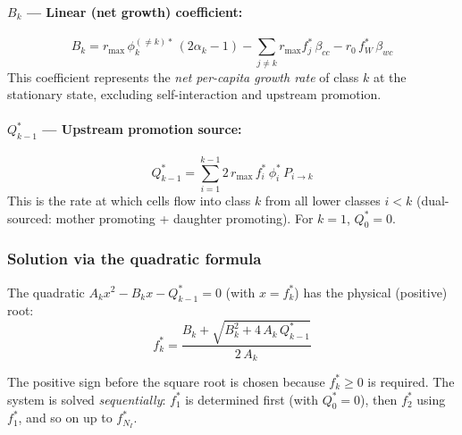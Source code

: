 \documentclass[11pt,a4paper]{article}
\begin{document}
\paragraph{$B_k$ --- Linear (net growth) coefficient:}
\begin{equation}
    B_k = r_{\text{max}}\,\phi_k^{(\neq k)*}\,(2\alpha_k - 1) - \sum_{j \neq k} r_{\text{max}} f_j^*\,\beta_{cc} - r_0\,f_W^*\,\beta_{wc}
\end{equation}
This coefficient represents the \emph{net per-capita growth rate} of class $k$ at the stationary state, excluding self-interaction and upstream promotion.

\paragraph{$Q_{k-1}^*$ --- Upstream promotion source:}
\begin{equation}
    Q_{k-1}^* = \sum_{i=1}^{k-1} 2\, r_{\text{max}}\,f_i^*\,\phi_i^*\,P_{i \to k}
\end{equation}
This is the rate at which cells flow into class $k$ from all lower classes $i < k$ (dual-sourced: mother promoting + daughter promoting). For $k=1$, $Q_0^* = 0$.

\subsubsection*{Solution via the quadratic formula}

The quadratic $A_k x^2 - B_k x - Q_{k-1}^* = 0$ (with $x = f_k^*$) has the physical (positive) root:
\begin{equation}
    \boxed{f_k^* = \frac{B_k + \sqrt{B_k^2 + 4\,A_k\,Q_{k-1}^*}}{2\,A_k}}
\end{equation}

The positive sign before the square root is chosen because $f_k^* \geq 0$ is required. The system is solved \emph{sequentially}: $f_1^*$ is determined first (with $Q_0^* = 0$), then $f_2^*$ using $f_1^*$, and so on up to $f_{N_I}^*$.
\end{document}
